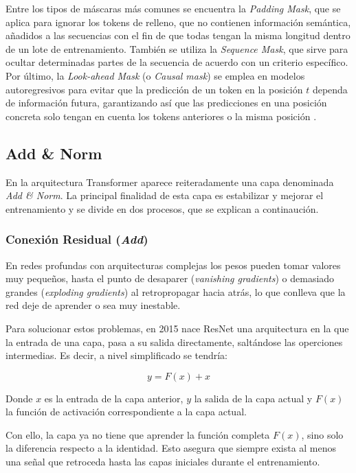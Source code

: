 \documentclass[11pt]{book}
\theoremstyle{plain}
\theoremstyle{definition}
\begin{document}
Entre los tipos de máscaras más comunes se encuentra la \textit{Padding Mask}, que se aplica para ignorar los tokens de relleno, que no contienen información semántica, añadidos a las secuencias con el fin de que todas tengan la misma longitud dentro de un lote de entrenamiento. También se utiliza la \textit{Sequence Mask}, que sirve para ocultar determinadas partes de la secuencia de acuerdo con un criterio específico. Por último, la \textit{Look-ahead Mask} (o \textit{Causal mask}) se emplea en modelos autoregresivos para evitar que la predicción de un token en la posición $t$ dependa de información futura, garantizando así que las predicciones en una posición concreta solo tengan en cuenta los tokens anteriores o la misma posición \parencite{swarms_masking_pytorch}.


\subsection{Add \& Norm \parencite{sharma2024addnorm}} \label{subsec:addnorm}

En la arquitectura Transformer aparece reiteradamente una capa denominada \textit{Add \& Norm}. La principal finalidad de esta capa es estabilizar y mejorar el entrenamiento y se divide en dos procesos, que se explican a continaución.
\subsubsection{Conexión Residual (\textit{Add})}
En redes profundas con arquitecturas complejas los pesos pueden tomar valores muy pequeños, hasta el punto de desaparer (\textit{vanishing gradients}) o demasiado grandes (\textit{exploding gradients}) al retropropagar hacia atrás, lo que conlleva que la red deje de aprender o sea muy inestable. 

Para solucionar estos problemas, en 2015 nace ResNet una arquitectura en la que la entrada de una capa, pasa a su salida directamente, saltándose las operciones intermedias. Es decir, a nivel simplificado se tendría: 

\[
y = F(x) + x
\]

Donde $x$ es la entrada de la capa anterior, $y$ la salida de la capa actual y $F(x)$ la función de activación correspondiente a la capa actual.

Con ello, la capa ya no tiene que aprender la función completa $F(x)$, sino solo la diferencia respecto a la identidad. Esto asegura que siempre exista al menos una señal que retroceda hasta las capas iniciales durante el entrenamiento.
\end{document}
